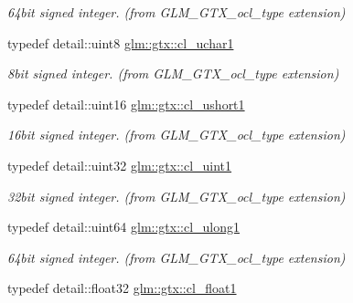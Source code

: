\begin{DoxyCompactItemize}
\begin{DoxyCompactList}\small\item\em 64bit signed integer. (from G\+L\+M\+\_\+\+G\+T\+X\+\_\+ocl\+\_\+type extension) \end{DoxyCompactList}\item 
\hypertarget{group__gtx__ocl__type_gad2a8f9b260f42b5b02dd57623c2025c0}{}typedef detail\+::uint8 \hyperlink{group__gtx__ocl__type_gad2a8f9b260f42b5b02dd57623c2025c0}{glm\+::gtx\+::cl\+\_\+uchar1}\label{group__gtx__ocl__type_gad2a8f9b260f42b5b02dd57623c2025c0}

\begin{DoxyCompactList}\small\item\em 8bit signed integer. (from G\+L\+M\+\_\+\+G\+T\+X\+\_\+ocl\+\_\+type extension) \end{DoxyCompactList}\item 
\hypertarget{group__gtx__ocl__type_ga04d1811397a6c422c57b18ce47863e3b}{}typedef detail\+::uint16 \hyperlink{group__gtx__ocl__type_ga04d1811397a6c422c57b18ce47863e3b}{glm\+::gtx\+::cl\+\_\+ushort1}\label{group__gtx__ocl__type_ga04d1811397a6c422c57b18ce47863e3b}

\begin{DoxyCompactList}\small\item\em 16bit signed integer. (from G\+L\+M\+\_\+\+G\+T\+X\+\_\+ocl\+\_\+type extension) \end{DoxyCompactList}\item 
\hypertarget{group__gtx__ocl__type_ga8a24e9d78a7b0332832c516fe4033a95}{}typedef detail\+::uint32 \hyperlink{group__gtx__ocl__type_ga8a24e9d78a7b0332832c516fe4033a95}{glm\+::gtx\+::cl\+\_\+uint1}\label{group__gtx__ocl__type_ga8a24e9d78a7b0332832c516fe4033a95}

\begin{DoxyCompactList}\small\item\em 32bit signed integer. (from G\+L\+M\+\_\+\+G\+T\+X\+\_\+ocl\+\_\+type extension) \end{DoxyCompactList}\item 
\hypertarget{group__gtx__ocl__type_gab9cfdc884d5abafd043a5bbaa573438b}{}typedef detail\+::uint64 \hyperlink{group__gtx__ocl__type_gab9cfdc884d5abafd043a5bbaa573438b}{glm\+::gtx\+::cl\+\_\+ulong1}\label{group__gtx__ocl__type_gab9cfdc884d5abafd043a5bbaa573438b}

\begin{DoxyCompactList}\small\item\em 64bit signed integer. (from G\+L\+M\+\_\+\+G\+T\+X\+\_\+ocl\+\_\+type extension) \end{DoxyCompactList}\item 
\hypertarget{group__gtx__ocl__type_ga12d81003f5bf1ac975bd9ae82da9ffd5}{}typedef detail\+::float32 \hyperlink{group__gtx__ocl__type_ga12d81003f5bf1ac975bd9ae82da9ffd5}{glm\+::gtx\+::cl\+\_\+float1}\label{group__gtx__ocl__type_ga12d81003f5bf1ac975bd9ae82da9ffd5}


\end{DoxyCompactItemize}
